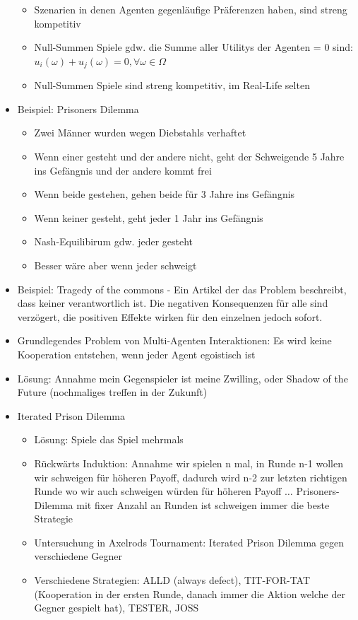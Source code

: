\documentclass{article} %
\begin{document}
\begin{itemize}
\begin{itemize}
			\item Szenarien in denen Agenten gegenläufige Präferenzen haben, sind streng kompetitiv
			\item Null-Summen Spiele gdw. die Summe aller Utilitys der Agenten = 0 sind: $u_i(\omega) + u_j(\omega) = 0, \forall \omega \in \Omega$
			\item Null-Summen Spiele sind streng kompetitiv, im Real-Life selten
		\end{itemize}
		\item Beispiel: Prisoners Dilemma
		\begin{itemize}
			\item Zwei Männer wurden wegen Diebstahls verhaftet 
			\item Wenn einer gesteht und der andere nicht, geht der Schweigende 5 Jahre ins Gefängnis und der andere kommt frei
			\item Wenn beide gestehen, gehen beide für 3 Jahre ins Gefängnis
			\item Wenn keiner gesteht, geht jeder 1 Jahr ins Gefängnis
			\item Nash-Equilibirum gdw. jeder gesteht
			\item Besser wäre aber wenn jeder schweigt
		\end{itemize}
 		\item Beispiel: Tragedy of the commons - Ein Artikel der das Problem beschreibt, dass keiner verantwortlich ist. Die negativen Konsequenzen für alle sind verzögert, die positiven Effekte wirken für den einzelnen jedoch sofort.
		\item Grundlegendes Problem von Multi-Agenten Interaktionen: Es wird keine Kooperation entstehen, wenn jeder Agent egoistisch ist
		\item Lösung: Annahme mein Gegenspieler ist meine Zwilling, oder Shadow of the Future (nochmaliges treffen in der Zukunft)
		\item Iterated Prison Dilemma
		\begin{itemize}
			\item Lösung: Spiele das Spiel mehrmals
			\item Rückwärts Induktion: Annahme wir spielen n mal, in Runde n-1 wollen wir schweigen für höheren Payoff, dadurch wird n-2 zur letzten richtigen Runde wo wir auch schweigen würden für höheren Payoff $\dots$ Prisoners-Dilemma mit fixer Anzahl an Runden ist schweigen immer die beste Strategie
			\item Untersuchung in Axelrods Tournament: Iterated Prison Dilemma gegen verschiedene Gegner
			\item Verschiedene Strategien: ALLD (always defect), TIT-FOR-TAT (Kooperation in der ersten Runde, danach immer die Aktion welche der Gegner gespielt hat), TESTER, JOSS
		\end{itemize}
	\end{itemize}
\end{document}
